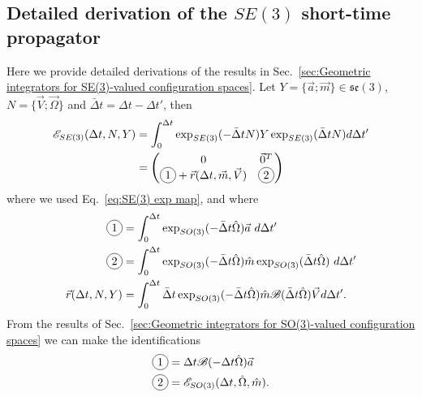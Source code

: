 \documentclass[withindex,glossary,techreport]{cam-thesis}
\newcommand*\circled[1]{\tikz[baseline=(char.base)]{
            \node[shape=circle,draw,inner sep=2pt] (char) {#1};}}
\begin{document}
\begin{appendices}
\chapter{Detailed derivation of the $SE(3)$ short-time propagator} \label{app:Detailed derivation of the SE(3) short-time propagator}

Here we provide detailed derivations of the results in Sec.~\ref{sec:Geometric integrators for SE(3)-valued configuration spaces}. Let $Y = \{ \vec{a} ; \vec{m} \} \in \mathfrak{se}(3)$, $N = \{ \vec{V} ; \vec{\Omega} \}$ and $\bar{\Delta} t = \Delta t - \Delta t'$, then
\begin{equation} \label{eq:E thingie SE(3)}
\begin{aligned}
	\mathscr{E}_{SE(3)}(\Delta t, N, Y) &  = \int_0^{\Delta t} \exp_{SE(3)}(-\bar{\Delta} t N) Y \exp_{SE(3)}(\bar{\Delta} t N) d \Delta t' \\
	& = \begin{pmatrix}
		0 & \vec{0}^T \\
		\circled{1} + \vec{r}(\Delta t, \vec{m}, \vec{V}) & \circled{2}
		\end{pmatrix}
\end{aligned}
\end{equation}
where we used Eq.~\ref{eq:SE(3) exp map}, and where
\begin{subequations}
	\begin{align}
	\circled{1} & = \int_0^{\Delta t} \exp_{SO(3)}(-\bar{\Delta} t \hat{\Omega}) \vec{a}\  d \Delta t' \\
	\circled{2} & = \int_0^{\Delta t} \exp_{SO(3)}(-\bar{\Delta} t \hat{\Omega}) \hat{m} \exp_{SO(3)}( \bar{\Delta} t \hat{\Omega})\ d \Delta t' \\
	\vec{r}(\Delta t, N, Y) & = \int_0^{\Delta t} \bar{\Delta} t \exp_{SO(3)}(-\bar{\Delta} t \hat{\Omega}) \hat{m} \mathscr{B}(\bar{\Delta} t \hat{\Omega}) \vec{V}  d \Delta t'.
	\end{align}
\end{subequations}
From the results of Sec.~\ref{sec:Geometric integrators for SO(3)-valued configuration spaces} we can make the identifications
\begin{subequations}
	\begin{align}
		\circled{1} & = \Delta t \mathscr{B}( - \Delta t \hat{\Omega}) \vec{a} \\
		\circled{2} & = \mathscr{E}_{SO(3)}(\Delta t, \hat{\Omega}, \hat{m}).
	\end{align}
\end{subequations}

\end{appendices}
\end{document}
